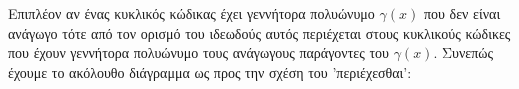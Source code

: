 \documentclass[oneside,a4paper]{article}
\newcommand{\C}{\mathcal{C}}
\newcommand{\R}{\mathcal{R}_{11}}
\begin{document}
\begin{enumerate}
	Επιπλέον αν ένας κυκλικός κώδικας έχει γεννήτορα πολυώνυμο $\gamma (x)$ που δεν είναι ανάγωγο τότε από τον ορισμό του ιδεωδούς αυτός περιέχεται στους κυκλικούς κώδικες που έχουν γεννήτορα πολυώνυμο τους ανάγωγους παράγοντες του $\gamma (x)$. Συνεπώς έχουμε το ακόλουθο διάγραμμα ως προς την σχέση του 'περιέχεσθαι':

	\begin{center}
	\end{center}
\pagebreak


\end{enumerate}
\end{document}
